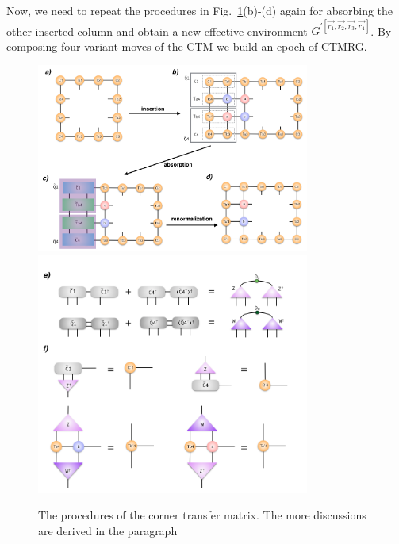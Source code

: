 Now, we need to repeat the procedures in Fig.~\ref{fig512}(b)-(d) again for absorbing the other inserted column and obtain a new effective environment $G^{\prime \left[\vec{r_1},\vec{r_2},\vec{r_3},\vec{r_4}\right]}$. By composing four variant moves of the CTM we build an epoch of CTMRG. 

\begin{figure}[ht]
	\centering
	\includegraphics[width=0.80\textwidth]{figures/fig512.png}
	\includegraphics[width=0.80\textwidth]{figures/fig513.png}
	\caption[The procedures of the corner transfer matrix.]{The procedures of the corner transfer matrix. The more discussions are derived in the paragraph}
	\label{fig512}
\end{figure}

